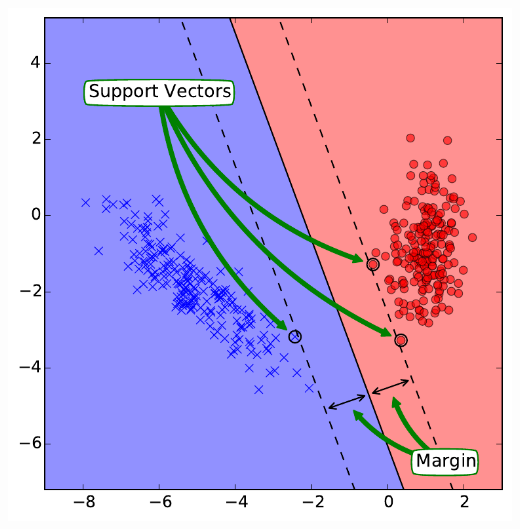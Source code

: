 \documentclass[10pt, aspectratio=169]{beamer} %
\begin{document}
\begin{frame}[fragile,allowframebreaks=0.8]
\begin{columns}[onlytextwidth]
\includegraphics[width=\columnwidth]{SVM_boundary.pdf}
\end{columns}
\end{frame}
\end{document}
